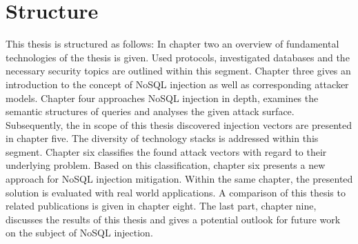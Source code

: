 \section{Structure}
This thesis is structured as follows: In chapter two an overview of fundamental technologies of the thesis is given. Used protocols, investigated databases and the necessary security topics are outlined within this segment. Chapter three gives an introduction to the concept of NoSQL injection as well as corresponding attacker models. Chapter four approaches NoSQL injection in depth, examines the semantic structures of queries and analyses the given attack surface. Subsequently, the in scope of this thesis discovered injection vectors are presented in chapter five. The diversity of technology stacks is addressed within this segment. Chapter six classifies the found attack vectors with regard to their underlying problem. Based on this classification, chapter six presents a new approach for NoSQL injection mitigation. Within the same chapter, the presented solution is evaluated with real world applications. A comparison of this thesis to related publications is given in chapter eight. The last part, chapter nine, discusses the results of this thesis and gives a potential outlook for future work on the subject of NoSQL injection.